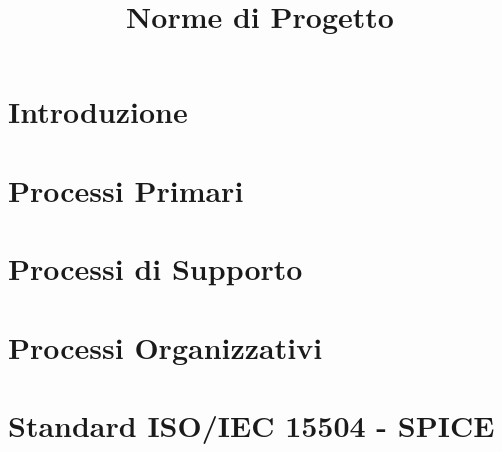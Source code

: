 \documentclass{classes/base}
\title{Norme di Progetto}
\author{\matteo}
\begin{document}
	\maketitle
	\newpage
	
	\newpage
	\tableofcontents
	
	\newpage
	\section{Introduzione}
	
	
	\newpage
	\section{Processi Primari}
	
	
	\newpage
	\section{Processi di Supporto}
	
	
	\newpage
	\section{Processi Organizzativi}
	
	
	\newpage
	\section{Standard ISO/IEC 15504 - SPICE}
	
	
\end{document}
